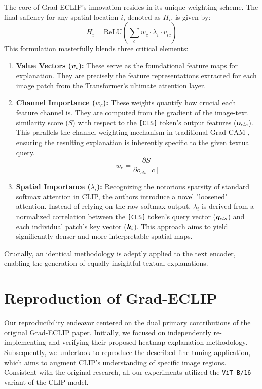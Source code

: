 \documentclass[10pt]{article} %
\begin{document}
The core of Grad-ECLIP's innovation resides in its unique weighting scheme. The final saliency for any spatial location $i$, denoted as $H_i$, is given by:
\begin{equation}
H_i = \text{ReLU} \left( \sum_{c} w_c \cdot \lambda_i \cdot v_{ic} \right)
\end{equation}
This formulation masterfully blends three critical elements:
\begin{enumerate}
    \item \textbf{Value Vectors (${\bm{v}}_i$):} These serve as the foundational feature maps for explanation. They are precisely the feature representations extracted for each image patch from the Transformer's ultimate attention layer.
    \item \textbf{Channel Importance ($w_c$):} These weights quantify how crucial each feature channel is. They are computed from the gradient of the image-text similarity score ($S$) with respect to the \texttt{[CLS]} token's output features (${\bm{o}}_{cls}$). This parallels the channel weighting mechanism in traditional Grad-CAM \citep{selvaraju2017grad}, ensuring the resulting explanation is inherently specific to the given textual query.
    \begin{equation}
    w_c = \frac{\partial S}{\partial o_{cls}[c]}
    \end{equation}
    \item \textbf{Spatial Importance ($\lambda_i$):} Recognizing the notorious sparsity of standard softmax attention in CLIP, the authors introduce a novel "loosened" attention. Instead of relying on the raw softmax output, $\lambda_i$ is derived from a normalized correlation between the \texttt{[CLS]} token's query vector (${\bm{q}}_{cls}$) and each individual patch's key vector (${\bm{k}}_i$). This approach aims to yield significantly denser and more interpretable spatial maps.
\end{enumerate}
Crucially, an identical methodology is adeptly applied to the text encoder, enabling the generation of equally insightful textual explanations.

\section{Reproduction of Grad-ECLIP}
\label{repro_efforts}

Our reproducibility endeavor centered on the dual primary contributions of the original Grad-ECLIP paper. Initially, we focused on independently re-implementing and verifying their proposed heatmap explanation methodology. Subsequently, we undertook to reproduce the described fine-tuning application, which aims to augment CLIP's understanding of specific image regions. Consistent with the original research, all our experiments utilized the \texttt{ViT-B/16} variant of the CLIP model.
\end{document}
